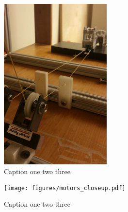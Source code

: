 \begin{figure}[loadcells_pulley]
  \label{fig:loadcells_pulley}
  \centering
  \includegraphics[width=0.5\textwidth]{figures/loadcells_pulley.pdf}
  \caption{Caption one two three}
\end{figure}
\begin{figure}[motors_closeup]
  \label{fig:motors_closeup}
  \centering
  \texttt{[image: figures/motors\_closeup.pdf]}
  \caption{Caption one two three}
\end{figure}
